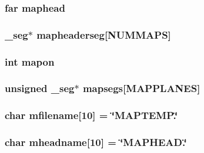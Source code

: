 \label{ID__CA_8C_a04317788d33560e757415d06e7688914}
\hypertarget{ID__CA_8C_a472b90622a8d5fc66c491bf032d769d2}{
\subsubsection[{maphead}]{ far {\bf maphead}}}
\label{ID__CA_8C_a472b90622a8d5fc66c491bf032d769d2}
\hypertarget{ID__CA_8C_a4fa58ff79559a7ff81611311489c8e70}{
\subsubsection[{mapheaderseg}]{ \_\-seg$\ast$ {\bf mapheaderseg}\mbox{[}NUMMAPS\mbox{]}}}
\label{ID__CA_8C_a4fa58ff79559a7ff81611311489c8e70}
\hypertarget{ID__CA_8C_a9bc2aa6f5318e11111d85d1f526f4ed9}{
\subsubsection[{mapon}]{\setlength{\rightskip}{0pt plus 5cm}int {\bf mapon}}}
\label{ID__CA_8C_a9bc2aa6f5318e11111d85d1f526f4ed9}
\hypertarget{ID__CA_8C_aa491c919acbb7c3a3626dc79014b7b7b}{
\subsubsection[{mapsegs}]{\setlength{\rightskip}{0pt plus 5cm}unsigned \_\-seg$\ast$ {\bf mapsegs}\mbox{[}MAPPLANES\mbox{]}}}
\label{ID__CA_8C_aa491c919acbb7c3a3626dc79014b7b7b}
\hypertarget{ID__CA_8C_aed11d164b12fd19ca11fee978f42673d}{
\subsubsection[{mfilename}]{\setlength{\rightskip}{0pt plus 5cm}char {\bf mfilename}\mbox{[}10\mbox{]} = \char`\"{}MAPTEMP.\char`\"{}}}
\label{ID__CA_8C_aed11d164b12fd19ca11fee978f42673d}
\hypertarget{ID__CA_8C_ad22a6c11e49c368ace6f3aca1057b21d}{
\subsubsection[{mheadname}]{\setlength{\rightskip}{0pt plus 5cm}char {\bf mheadname}\mbox{[}10\mbox{]} = \char`\"{}MAPHEAD.\char`\"{}}}
